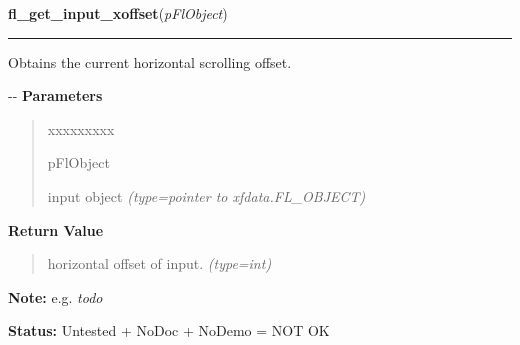 \hspace{.8\funcindent}\begin{boxedminipage}{\funcwidth}

    \raggedright \textbf{fl\_get\_input\_xoffset}(\textit{pFlObject})

    \vspace{-1.5ex}

    \rule{\textwidth}{0.5\fboxrule}
\setlength{\parskip}{2ex}

Obtains the current horizontal scrolling offset.

-{}-
\setlength{\parskip}{1ex}
      \textbf{Parameters}
      \vspace{-1ex}

      \begin{quote}
        \begin{Ventry}{xxxxxxxxx}

          \item[pFlObject]


input object
            {\it (type=pointer to xfdata.FL\_OBJECT)}

        \end{Ventry}

      \end{quote}

      \textbf{Return Value}
    \vspace{-1ex}

      \begin{quote}

horizontal offset of input.
      {\it (type=int)}

      \end{quote}

\textbf{Note:} 
e.g. \emph{todo}


\textbf{Status:} 
Untested + NoDoc + NoDemo = NOT OK


    \end{boxedminipage}

    \label{xformslib:flinput:fl_set_input_fieldchar}

    \vspace{0.5ex}

